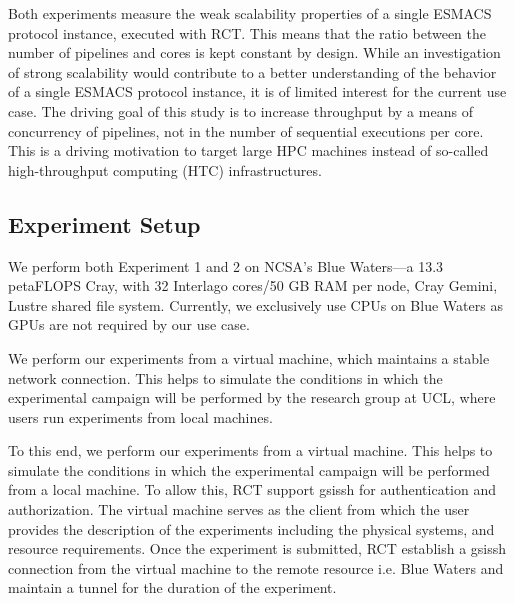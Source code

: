 \documentclass{bmcart}
\begin{document}
Both experiments measure the weak scalability properties of a single ESMACS protocol instance, executed with RCT\@. This
means that the ratio between the number of pipelines and cores is kept
constant by design. While an investigation of strong scalability would
contribute to a better understanding of the behavior of a single ESMACS protocol
instance,
it is of limited interest for the current use case. The driving goal of this 
study is to increase throughput by a means of concurrency of pipelines, not in the
number of sequential executions per core. This is a driving motivation to
target large HPC machines instead of so-called high-throughput computing (HTC) 
infrastructures.

\subsection*{Experiment Setup}\label{ssec:exp_setup}

We perform both Experiment 1 and 2 on NCSA's Blue Waters---a 13.3 petaFLOPS
Cray, with 32 Interlago cores/50 GB RAM per node, Cray Gemini, Lustre shared
file system. Currently, we exclusively use CPUs on Blue Waters as GPUs are
not required by our use case. 


We perform our experiments from a virtual machine, which maintains a stable network connection. This helps to simulate the conditions in which the experimental campaign will be performed by the research group at UCL\@, where users run experiments from local machines. 



To this end, we perform our experiments from a virtual machine. This
helps to simulate the conditions in which the experimental campaign will be
performed from a local machine. To allow this, RCT support \textmd{gsissh} for
authentication and authorization. The virtual machine serves as the client from 
which the user provides the description of the experiments including the physical systems, and resource requirements. Once the experiment is submitted, RCT establish a gsissh connection from the virtual machine to the remote resource i.e. Blue Waters and maintain a tunnel for the duration of the experiment. 
\end{document}
